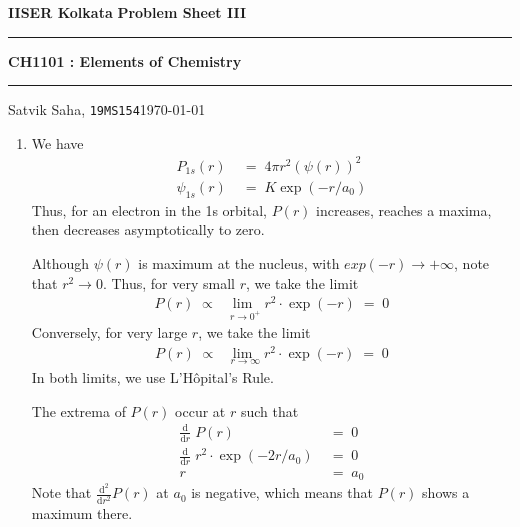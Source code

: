 \documentclass[10pt]{article}
\begin{document}
        \par\textbf{IISER Kolkata} \hfill \textbf{Problem Sheet III}
        \vspace{3pt}
        \hrule
        \vspace{3pt}
        \begin{center}
                \LARGE{\textbf{CH1101 : Elements of Chemistry}}
        \end{center}
        \vspace{3pt}
        \hrule
        \vspace{3pt}
        Satvik Saha, \texttt{19MS154}\hfill\today
        \vspace{20pt}

        \begin{enumerate}
                \item We have
                \begin{align*}
                        P_{1s}(r) \;&=\; 4\pi r^2 \left( \psi(r) \right)^2 \\
                        \psi_{1s}(r) \;&=\; K \exp(-r/a_0)
                \end{align*}
                Thus, for an electron in the 1s orbital, $P(r)$ increases, reaches a maxima, then decreases asymptotically
                to zero.
                
                Although $\psi(r)$ is maximum at the nucleus, with $exp(-r) \to +\infty$, note that $r^2 \to 0$. Thus,
                for very small $r$, we take the limit
                \begin{align*}
                        P(r) \;\propto\; \lim_{\;\;r \to 0^+} r^2 \cdot \exp(-r) \;=\; 0
                \end{align*}
                Conversely, for very large $r$, we take the limit
                \begin{align*}
                        P(r) \;\propto\; \lim_{\;\;r \to \infty} r^2 \cdot \exp(-r) \;=\; 0
                \end{align*}
                In both limits, we use L'H\^ opital's Rule.

                The extrema of $P(r)$ occur at $r$ such that 
                \begin{align*}
                        \frac{\mathrm{d} }{\mathrm{d}r}\; P(r) \;&=\; 0 \\
                        \frac{\mathrm{d} }{\mathrm{d}r}\; r^2 \cdot \exp(-2r/a_0) \;&=\; 0 \\
                        r \;&=\; a_0
                \end{align*}
                Note that $\frac{\mathrm{d}^2 }{\mathrm{d}r^2} P(r)$ at $a_0$ is negative, which means that $P(r)$ shows a maximum there.


\end{enumerate}
\end{document}
